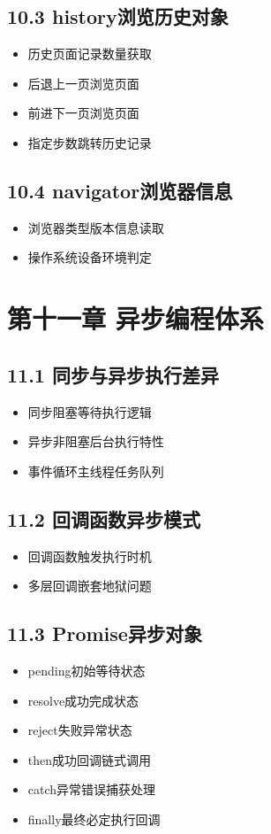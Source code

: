 \subsection{10.3 history浏览历史对象}
\begin{itemize}
\item 历史页面记录数量获取
\item 后退上一页浏览页面
\item 前进下一页浏览页面
\item 指定步数跳转历史记录
\end{itemize}

\subsection{10.4 navigator浏览器信息}
\begin{itemize}
\item 浏览器类型版本信息读取
\item 操作系统设备环境判定
\end{itemize}

\section{第十一章 异步编程体系}
\subsection{11.1 同步与异步执行差异}
\begin{itemize}
\item 同步阻塞等待执行逻辑
\item 异步非阻塞后台执行特性
\item 事件循环主线程任务队列
\end{itemize}

\subsection{11.2 回调函数异步模式}
\begin{itemize}
\item 回调函数触发执行时机
\item 多层回调嵌套地狱问题
\end{itemize}

\subsection{11.3 Promise异步对象}
\begin{itemize}
\item pending初始等待状态
\item resolve成功完成状态
\item reject失败异常状态
\item then成功回调链式调用
\item catch异常错误捕获处理
\item finally最终必定执行回调
\end{itemize}


